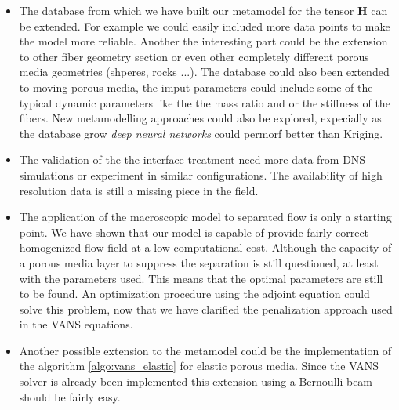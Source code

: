 \begin{itemize}

\item The database from which we have built our metamodel for the tensor $\mathbf{H}$ can be extended. For example we could easily included more data 
points to make the model more reliable. Another the interesting part could be the extension to other fiber geometry section or even other completely different
 porous media geometries (shperes, rocks ...). The database could also been extended to moving porous media, the imput parameters could include some of the 
 typical dynamic parameters like the the mass ratio and or the stiffness of the fibers. New metamodelling approaches could also be explored, expecially as 
 the database grow \textit{deep neural networks} could permorf better than Kriging.

\item The validation of the the interface treatment need more data from DNS simulations or experiment in similar configurations. The availability of high 
resolution data is still a missing piece in the field.

\item The application of the macroscopic model to separated flow is only a starting point. We have shown that our model is capable of provide fairly correct 
homogenized flow field at a low computational cost. Although the capacity of a porous media layer to suppress the separation is still questioned, at least 
with the parameters used. This means that the optimal parameters are still to be found. An optimization procedure using the adjoint equation could solve this
 problem, now that we have clarified the penalization approach used in the VANS equations.

\item Another possible extension to the metamodel could be the implementation of the algorithm \ref{algo:vans_elastic} for elastic porous media. Since the 
VANS solver is already been implemented this extension using a Bernoulli beam should be fairly easy.
\end{itemize}
